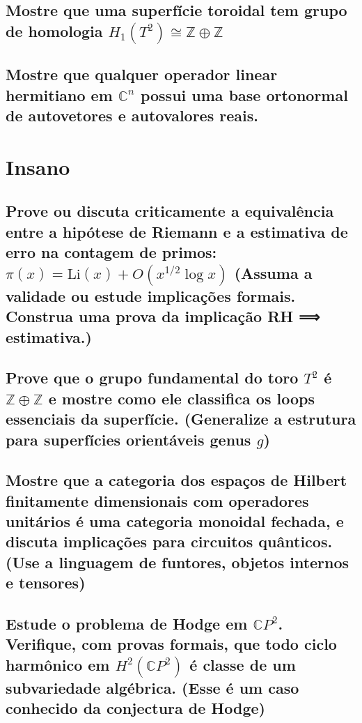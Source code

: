 \documentclass{article}
\begin{document}
\subsection{Mostre que uma superfície toroidal tem grupo de homologia $H_1(T^2) \cong \mathbb{Z} \oplus \mathbb{Z}$}

\subsection{Mostre que qualquer operador linear hermitiano em $\mathbb{C}^n$ possui uma base ortonormal de autovetores e autovalores reais.}

\section{Insano}

\subsection{Prove ou discuta criticamente a equivalência entre a hipótese de Riemann e a estimativa de erro na contagem de primos: $\pi(x) = \text{Li}(x) + O\left(x^{1/2} \log x\right)$ (Assuma a validade ou estude implicações formais. Construa uma prova da implicação RH ⟹ estimativa.)}

\subsection{Prove que o grupo fundamental do toro $T^2$ é $\mathbb{Z} \oplus \mathbb{Z}$  e mostre como ele classifica os loops essenciais da superfície. (Generalize a estrutura para superfícies orientáveis genus $g$)}

\subsection{Mostre que a categoria dos espaços de Hilbert finitamente dimensionais com operadores unitários é uma categoria monoidal fechada, e discuta implicações para circuitos quânticos.
(Use a linguagem de funtores, objetos internos e tensores)}

\subsection{Estude o problema de Hodge em $\mathbb{C}P^2$. Verifique, com provas formais, que todo ciclo harmônico em $H^{2}( \mathbb{C}P^2 )$ é classe de um subvariedade algébrica.
(Esse é um caso conhecido da conjectura de Hodge)}
\end{document}
